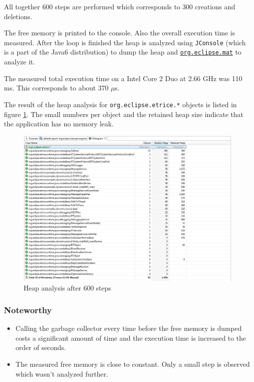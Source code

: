 All together 600 steps are performed which corresponds to 300 creations and deletions.

The free memory is printed to the console. Also the overall execution time is measured.
After the loop is finished the heap is analyzed using \texttt{JConsole} (which is a part
of the Java6 distribution) to dump the heap and
\href{http://www.eclipse.org/mat/}{\texttt{org.eclipse.mat}} to analyze it.

The measured total execution time on a Intel Core 2 Duo at 2.66 GHz was 110 ms.
This corresponds to about 370 $\mu$s.

The result of the heap analysis for \texttt{org.eclipse.etrice.*} objects is listed in figure \ref{fig:dynact2_heap}.
The small numbers per object and the retained heap size indicate that the application has no memory leak.

\begin{figure}
\includegraphics[scale=0.45]{images/039-DynAct2-HeapAnalysis.jpg}
\caption{Heap analysis after 600 steps}
\label{fig:dynact2_heap}
\end{figure}

\subsubsection{Noteworthy}

\begin{itemize}
\item Calling the garbage collector every time before the free memory is dumped
costs a significant amount of time and the execution time is increased to the order of seconds.
\item The measured free memory is close to constant. Only a small step is observed which wasn't analyzed further.
\end{itemize}

